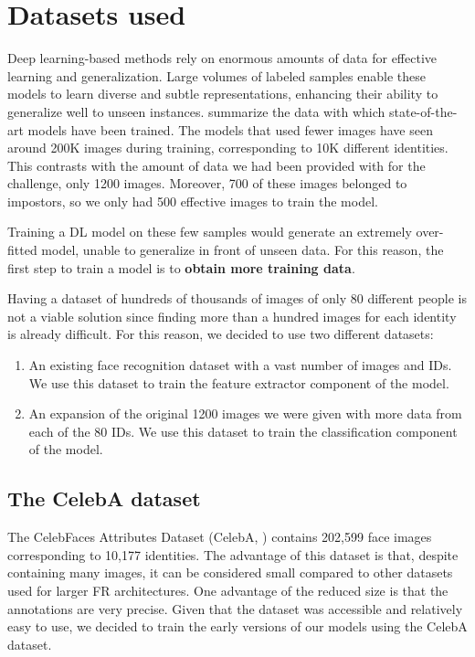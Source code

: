 \documentclass[11pt, a4paper]{article}
\numberwithin{equation}{subsection}
\begin{document}
\section{Datasets used}

Deep learning-based methods rely on enormous amounts of data for effective learning and generalization. Large volumes of labeled samples enable these models to learn diverse and subtle representations, enhancing their ability to generalize well to unseen instances. \citet{wang2021deep} summarize the data with which state-of-the-art models have been trained. The models that used fewer images have seen around 200K images during training, corresponding to 10K different identities. This contrasts with the amount of data we had been provided with for the challenge, only 1200 images. Moreover, 700 of these images belonged to impostors, so we only had 500 effective images to train the model.

Training a DL model on these few samples would generate an extremely over-fitted model, unable to generalize in front of unseen data. For this reason, the first step to train a model is to \textbf{obtain more training data}.

Having a dataset of hundreds of thousands of images of only 80 different people is not a viable solution since finding more than a hundred images for each identity is already difficult. For this reason, we decided to use two different datasets:

\begin{enumerate}
    \item An existing face recognition dataset with a vast number of images and IDs. We use this dataset to train the feature extractor component of the model.
    \item An expansion of the original 1200 images we were given with more data from each of the 80 IDs. We use this dataset to train the classification component of the model.
\end{enumerate}

\subsection{The CelebA dataset}

The CelebFaces Attributes Dataset (CelebA, \cite{liu2015faceattributes}) contains 202,599 face images corresponding to 10,177 identities. The advantage of this dataset is that, despite containing many images, it can be considered small compared to other datasets used for larger FR architectures. One advantage of the reduced size is that the annotations are very precise. Given that the dataset was accessible and relatively easy to use, we decided to train the early versions of our models using the CelebA dataset.
\end{document}
